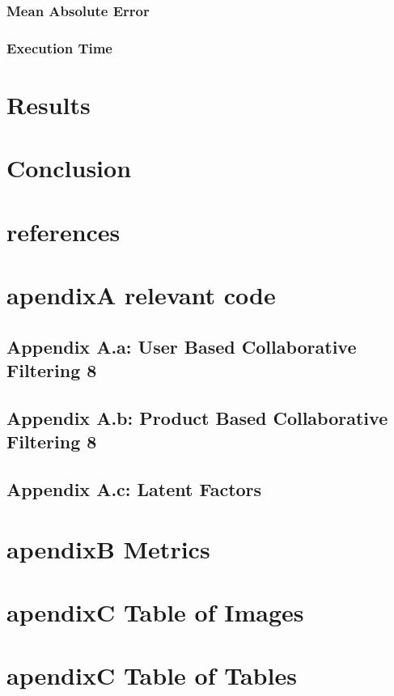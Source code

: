 \documentclass{article}
\begin{document}
\subsubsection{Mean Absolute Error}
\subsubsection{Execution Time}

\section{Results}
\section{Conclusion}
\section{references}
\section{apendixA relevant code}
\subsection{Appendix A.a: User Based Collaborative Filtering	8}
\subsection{Appendix A.b: Product Based Collaborative Filtering	8}
\subsection{Appendix A.c: Latent Factors}

\section{apendixB Metrics}
\section{apendixC Table of Images}
\section{apendixC Table of Tables}



\newpage


\end{document}
